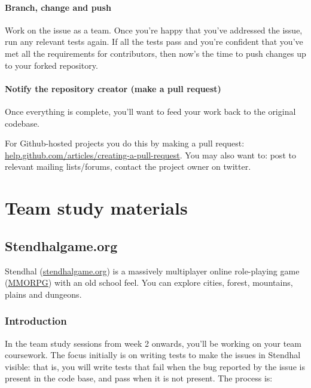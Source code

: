 \documentclass[
]{book}
\begin{document}
\hypertarget{bcp}{%
\subsection{Branch, change and push}\label{bcp}}

Work on the issue as a team. Once you're happy that you've addressed the issue, run any relevant tests again. If all the tests pass and you're confident that you've met all the requirements for contributors, then now's the time to push changes up to your forked repository.

\hypertarget{pullrequest}{%
\subsection{Notify the repository creator (make a pull request)}\label{pullrequest}}

Once everything is complete, you'll want to feed your work back to the original codebase.

For Github-hosted projects you do this by making a pull request: \href{https://help.github.com/articles/creating-a-pull-request}{help.github.com/articles/creating-a-pull-request}. You may also want to: post to relevant mailing lists/forums, contact the project owner on twitter.

\hypertarget{part-team-study-materials}{%
\part{Team study materials}\label{part-team-study-materials}}

\hypertarget{starting}{%
\chapter{Stendhalgame.org}\label{starting}}

Stendhal (\href{https://stendhalgame.org/}{stendhalgame.org}) is a massively multiplayer online role-playing game (\href{https://en.wikipedia.org/wiki/Massively_multiplayer_online_role-playing_game}{MMORPG}) with an old school feel. You can explore cities, forest, mountains, plains and dungeons.

\hypertarget{introduction-2}{%
\section{Introduction}\label{introduction-2}}

In the team study sessions from week 2 onwards, you'll be working on your team coursework. The focus initially is on writing tests to make the issues in Stendhal visible: that is, you will write tests that fail when the bug reported by the issue is present in the code base, and pass when it is not present. The process is:
\end{document}

